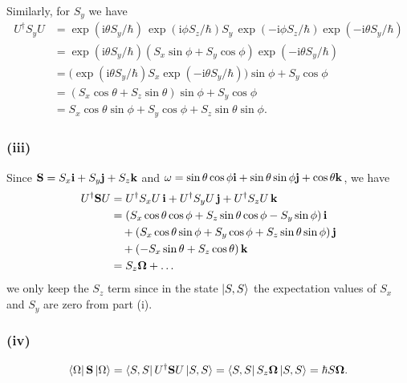 \documentclass{article}
\newcommand{\ii}{\mathrm{i}}
\begin{document}
Similarly, for $S_y$ we have
\begin{equation}
    \begin{split}
        U^\dagger S_y U&=\exp(\ii \theta S_y/\hbar)\, \exp(\ii \phi S_z/\hbar) S_y\,\exp(-\ii \phi S_z/\hbar)\exp(-\ii \theta S_y/\hbar)\\
                          &=\exp(\ii \theta S_y/\hbar) \left(S_x \sin\phi + S_y \cos\phi\right) \exp(-\ii \theta S_y/\hbar)\\
                            &= \big(\exp(\ii \theta S_y/\hbar) S_x \exp(-\ii \theta S_y/\hbar)\big)\sin\phi + S_y\cos\phi\\
                            &= \left(S_x\cos\theta + S_z\sin\theta\right)\sin\phi + S_y\cos\phi\\
                            &= S_x\cos\theta\sin\phi + S_y\cos\phi + S_z\sin\theta\sin\phi.
    \end{split}
\end{equation}


\subsubsection*{(iii)}
Since $\vb{S}=S_x \vb{i}+S_y \vb{j}+S_z \vb{k}$ and $\vb{\omega}=\sin{\theta}\cos{\phi}\vb{i}+\sin{\theta}\sin{\phi}\vb{j}+\cos{\theta}\vb{k}$, we have
    \begin{equation}
    \begin{split}
        U^\dagger \vb{S} U&= U^\dagger S_x U \,\vb{i}+U^\dagger S_y U \,\vb{j}+U^\dagger S_z U \,\vb{k}\\
                          &= (S_x\cos\theta\cos\phi + S_z\sin\theta\cos\phi - S_y\sin\phi)\,\vb{i} \\
                          &\quad+ (S_x\cos\theta\sin\phi + S_y\cos\phi + S_z\sin\theta\sin\phi)\,\vb{j} \\
                          &\quad+ ( - S_x\sin\theta + S_z\cos\theta)\,\vb{k}\\
                          &= S_z \vb{\Omega}+\dots
    \end{split}
\end{equation}
we only keep the $S_z$ term since in the state $\ket{S,S}$ the expectation values of $S_x$ and $S_y$ are zero from part (i).

\subsubsection*{(iv)}
\begin{equation}
    \begin{split}
        \bra{\Omega}\vb{S}\ket{\Omega}=\bra{S,S}U^\dagger \vb{S} U\ket{S,S}= \bra{S,S} S_z \vb{\Omega} \ket{S,S}=\hbar S \vb{\Omega}.
    \end{split}
\end{equation}
\end{document}
